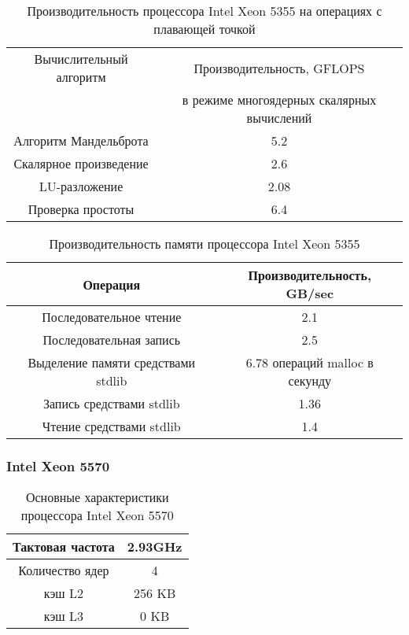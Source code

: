 \begin{table}[ht]
	\begin{center}
		\caption{Производительность процессора Intel Xeon  5355 на операциях с плавающей точкой}
		\begin{tabular}{|c|c|}
			\hline	
			Вычислительный алгоритм &  Производительность, GFLOPS \\ 
			& в режиме многоядерных скалярных вычислений \\ \hline
			Алгоритм Мандельброта  &  5.2 	\\ \hline
			Скалярное произведение &  2.6   \\ \hline
			LU-разложение          &  2.08   \\ \hline
			Проверка простоты      &  6.4  \\ \hline 
			
			
		\end{tabular}
	\end{center} 	
\end{table} 	

\begin{table}[ht]
	\begin{center}
		\caption{Производительность памяти процессора Intel Xeon 5355}
		\begin{tabular}{|c|c|}
			\hline	
			Операция  &  Производительность, GB/sec \\ \hline
			Последовательное чтение &  2.1 	\\  \hline
			Последовательная запись &  2.5   \\  \hline
			Выделение памяти средствами stdlib &  6.78 операций malloc в секунду  \\  \hline
			Запись средствами stdlib  & 1.36  \\ \hline
			Чтение средствами stdlib  & 1.4 \\ \hline 
		\end{tabular}
	\end{center} 	
\end{table} 	


\subsubsection{Intel Xeon 5570}

\begin{table}[ht]
	\begin{center}
		\caption{Основные характеристики процессора Intel Xeon  5570}
		\begin{tabular}{|c|c|}
			\hline	
			Тактовая частота & 2.93GHz   \\ \hline
			Количество ядер & 4 	     \\ \hline
			кэш L2         &  256 KB      \\ \hline
			кэш L3         &  0 KB        \\ \hline
		\end{tabular}
	\end{center} 	
\end{table} 	

